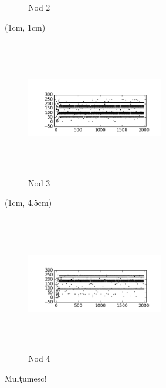 \documentclass{beamer}
\theoremstyle{definition}
\begin{document}
\begin{frame}
{\begin{textblock*}{4cm}
\begin{figure}
            \caption{Nod 2}
        \end{figure}
        \end{textblock*}
    }
     {
        \begin{textblock*}{4cm}(1cm, 1cm)
        \begin{figure}
            \includegraphics[width=6cm,height=6cm,keepaspectratio]{img/results/carouri_db3.png}
            \caption{Nod 3}
        \end{figure}
        \end{textblock*}
    }
     {
        \begin{textblock*}{4cm}(1cm, 4.5cm)
        \begin{figure}
            \includegraphics[width=6cm,height=6cm,keepaspectratio]{img/results/carouri_db4.png}
            \caption{Nod 4} 
        \end{figure}
        \end{textblock*}
    }
\end{frame}

\begin{frame}
\Huge{\centerline{Mul\c{t}umesc!}}
\end{frame}
\end{document}
